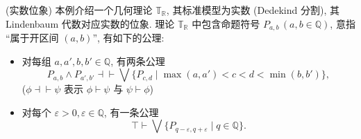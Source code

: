 \begin{example}
	{(实数位象)}
	本例介绍一个几何理论 $\mathbb T_{\mathbb{R}}$, 其标准模型为实数 (Dedekind 分割), 其 Lindenbaum 代数对应实数的位象. 理论 $\mathbb T_{\mathbb{R}}$ 中包含命题符号 $P_{a,b}\,(a,b\in \mathbb{Q})$, 意指 ``属于开区间 $(a,b)$'', 有如下的公理:
	\begin{itemize}
		\item 对每组 $a,a',b,b'\in\mathbb{Q}$, 有两条公理
		\[
		P_{a,b}\land P_{a',b'} \dashv\vdash \bigvee \{P_{c,d}\mid \max(a,a')<c<d<\min(b,b')\},
		\]
		($\phi\dashv\vdash\psi$ 表示 $\phi\vdash\psi$ 与 $\psi\vdash\phi$)
		\item 对每个 $\varepsilon>0,\varepsilon\in \mathbb{Q}$, 有一条公理
		\[
		\top\vdash\bigvee\{P_{q-\varepsilon,q+\varepsilon}\mid q\in \mathbb{Q}\}.
		\]
	\end{itemize}
\end{example}
